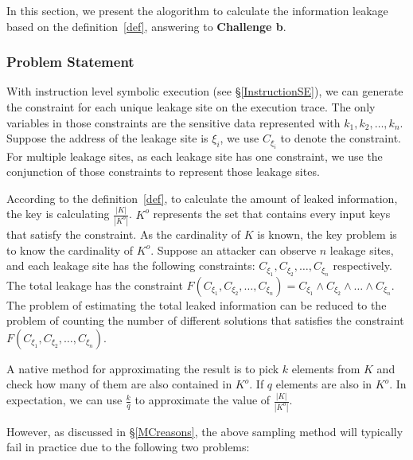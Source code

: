 \newcommand{\addr}[1]{{l}_{#1}}
\renewcommand{\addr}[1]{{\gamma}_{#1}}
\renewcommand{\addr}[1]{{\zeta}_{#1}}
\renewcommand{\addr}[1]{{\xi}_{#1}}

In this section, we present the alogorithm to calculate the information
leakage based on the definition~\ref{def}, answering to
\textbf{Challenge b}. 

\subsubsection{Problem Statement}
With instruction level symbolic execution (see \S\ref{InstructionSE}), we can generate the constraint 
for each unique leakage site on the execution trace.
The only variables in those constraints are the sensitive data represented
with $k_1, k_2, \ldots , k_n$. Suppose the address of the leakage site is $\addr{i}$,
we use $C_{\addr{i}}$ to denote the constraint. For multiple leakage sites, 
as each leakage site has one constraint, we 
use the conjunction of those constraints to represent those leakage sites. 

According to the definition~\ref{def}, to calculate the amount of leaked 
information, the key is calculating $\frac{|K|}{|K^o|}$. $K^o$ represents
the set that contains every input keys that satisfy the constraint. As the 
cardinality of $K$ is known, the key problem is to know the cardinality of
$K^o$. Suppose an attacker can observe $n$ leakage sites, and each leakage site has
the following constraints: $C_{\addr{1}}, C_{\addr{2}}, \ldots, C_{\addr{n}}$ respectively. 
The total leakage has the constraint 
$F(C_{\addr{1}},C_{\addr{2}},\ldots,C_{\addr{n}}) = C_{\addr{1}} \land C_{\addr{2}} 
\land \ldots \land C_{\addr{n}}$. The problem of estimating the total leaked information 
can be reduced to the problem of counting the number of different solutions 
that satisfies the constraint $F(C_{\addr{1}},C_{\addr{2}},\ldots,C_{\addr{n}})$. 

A native method for approximating 
the result is to pick $k$ elements from $K$ and check how many of them are also
contained in $K^o$. If $q$ elements are also in $K^o$. In expectation, we can
use $\frac{k}{q}$ to approximate the value of $\frac{|K|}{|K^o|}$.

However, as discussed in \S\ref{MCreasons},
the above sampling method will typically fail in practice due to the following two problems:

